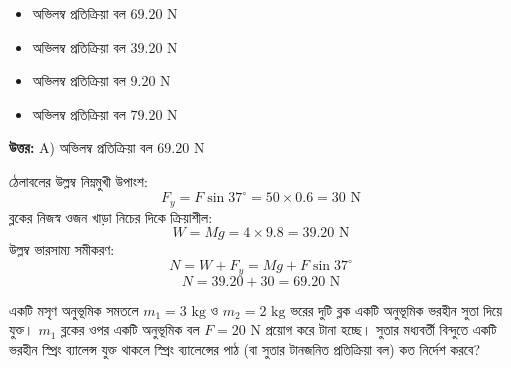 \documentclass[12pt, a4paper]{article}
\begin{document}
{\begin{center}
\end{center}
\vspace{1em}

\begin{itemize}[label={}, leftmargin=1cm, itemsep=0.5em]
\item[\textbf{A)}] অভিলম্ব প্রতিক্রিয়া বল $69.20\text{ N}$
\item[\textbf{B)}] অভিলম্ব প্রতিক্রিয়া বল $39.20\text{ N}$
\item[\textbf{C)}] অভিলম্ব প্রতিক্রিয়া বল $9.20\text{ N}$
\item[\textbf{D)}] অভিলম্ব প্রতিক্রিয়া বল $79.20\text{ N}$
\end{itemize}

\vspace{0.5em}
\begin{tcolorbox}[answerbox]
\textbf{\color{success} উত্তর:} A) অভিলম্ব প্রতিক্রিয়া বল $69.20\text{ N}$
\end{tcolorbox}
\vspace{1em}

\begin{tcolorbox}[solutionbox={সমাধান (Solution)}]
\noindent
ঠেলাবলের উল্লম্ব নিম্নমুখী উপাংশ:
\[ F_y = F \sin 37^\circ = 50 \times 0.6 = 30\text{ N} \]
ব্লকের নিজস্ব ওজন খাড়া নিচের দিকে ক্রিয়াশীল:
\[ W = M g = 4 \times 9.8 = 39.20\text{ N} \]
উল্লম্ব ভারসাম্য সমীকরণ:
\[ N = W + F_y = M g + F \sin 37^\circ \]
\[ N = 39.20 + 30 = 69.20\text{ N} \]
\end{tcolorbox}


\begin{tcolorbox}[questionbox={প্রশ্ন (Question) 14}]
\noindent
একটি মসৃণ অনুভূমিক সমতলে $m_1 = 3\text{ kg}$ ও $m_2 = 2\text{ kg}$ ভরের দুটি ব্লক একটি অনুভূমিক ভরহীন সুতা দিয়ে যুক্ত। $m_1$ ব্লকের ওপর একটি অনুভূমিক বল $F = 20\text{ N}$ প্রয়োগ করে টানা হচ্ছে। সুতার মধ্যবর্তী বিন্দুতে একটি ভরহীন স্প্রিং ব্যালেন্স যুক্ত থাকলে স্প্রিং ব্যালেন্সের পাঠ (বা সুতার টানজনিত প্রতিক্রিয়া বল) কত নির্দেশ করবে?


\end{tcolorbox}}
\end{document}
